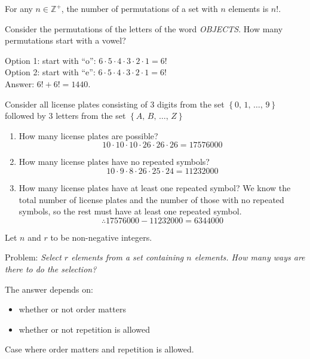 \begin{theorm}
    For any $n\in\mathbb Z^+$, the number of permutations of a set with $n$ elements is $n!$.
\end{theorm}

\begin{example}
    Consider the permutations of the letters of the word \emph{OBJECTS}. How many permutations start with a vowel?

    Option 1: start with ``o'': $6\cdot 5\cdot 4\cdot 3\cdot 2\cdot 1 = 6!$ \\
    Option 2: start with ``e'': $6\cdot 5\cdot 4\cdot 3\cdot 2\cdot 1 = 6!$
    \\
    Answer: $6!+6! = 1440$.
\end{example}

\begin{example}
    Consider all license plates consisting of 3 digits from the set $\left\{0,\,1,\,\dots,\,9\right\}$ followed by 3 letters from the set $\left\{A,\,B,\,\dots,\,Z\right\}$

    \begin{enumerate}
        \item How many license plates are possible?
        $$10\cdot 10\cdot 10 \cdot 26\cdot 26\cdot 26 = 17576000$$
        \item How many license plates have no repeated symbols?
        $$10\cdot 9\cdot 8\cdot 26\cdot 25\cdot 24 = 11232000$$
        \item How many license plates have at least one repeated symbol?
        We know the total number of license plates and the number of those with no repeated symbols, so the rest must have at least one repeated symbol. $$\therefore 17576000 - 11232000 = 6344000$$
    \end{enumerate}
\end{example}

Let $n$ and $r$ to be non-negative integers.

Problem: \emph{Select $r$ elements from a set containing $n$ elements. How many ways are there to do the selection?}

The answer depends on:
\begin{itemize}
    \item whether or not order matters
    \item whether or not repetition is allowed
\end{itemize}

Case where order matters and repetition is allowed.


